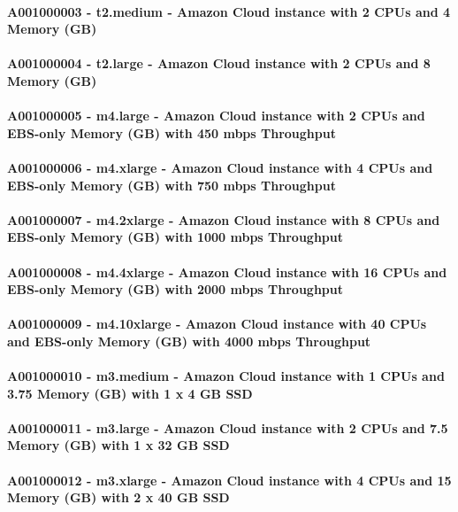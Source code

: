 \paragraph{A001000003 - t2.medium - Amazon Cloud instance with 2 CPUs and 4 Memory (GB)}
\paragraph{A001000004 - t2.large - Amazon Cloud instance with 2 CPUs and 8 Memory (GB)}
\paragraph{A001000005 - m4.large - Amazon Cloud instance with 2 CPUs and EBS-only Memory (GB) with 450 mbps Throughput}
\paragraph{A001000006 - m4.xlarge - Amazon Cloud instance with 4 CPUs and EBS-only Memory (GB) with 750 mbps Throughput}
\paragraph{A001000007 - m4.2xlarge - Amazon Cloud instance with 8 CPUs and EBS-only Memory (GB) with 1000 mbps Throughput}
\paragraph{A001000008 - m4.4xlarge - Amazon Cloud instance with 16 CPUs and EBS-only Memory (GB) with 2000 mbps Throughput}
\paragraph{A001000009 - m4.10xlarge - Amazon Cloud instance with 40 CPUs and EBS-only Memory (GB) with 4000 mbps Throughput}
\paragraph{A001000010 - m3.medium - Amazon Cloud instance with 1 CPUs and 3.75 Memory (GB) with 1 x 4 GB SSD}
\paragraph{A001000011 - m3.large - Amazon Cloud instance with 2 CPUs and 7.5 Memory (GB) with 1 x 32 GB SSD}
\paragraph{A001000012 - m3.xlarge - Amazon Cloud instance with 4 CPUs and 15 Memory (GB) with 2 x 40 GB SSD}
